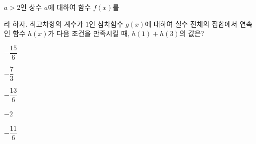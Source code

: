 $a>2$인 상수 $a$에 대하여 함수 $f(x)$를 \par\smallskip{}\par\smallskip\noindent 라 하자. 최고차항의 계수가 $1$인 삼차함수 $g(x)$에 대하여 실수 전체의 집합에서 연속인 함수 $h(x)$가 다음 조건을 만족시킬 때, $h(1)+h(3)$의 값은? 
\begin{choices32}{\rule[-3ex]{0pt}{8ex}$-\dfrac{15}{6}$}{\rule[-3ex]{0pt}{8ex}$-\dfrac{7}{3}$}{\rule[-3ex]{0pt}{8ex}$-\dfrac{13}{6}$}{\rule[-3ex]{0pt}{8ex}$-2$}{\rule[-3ex]{0pt}{8ex}$-\dfrac{11}{6}$}\end{choices32}
